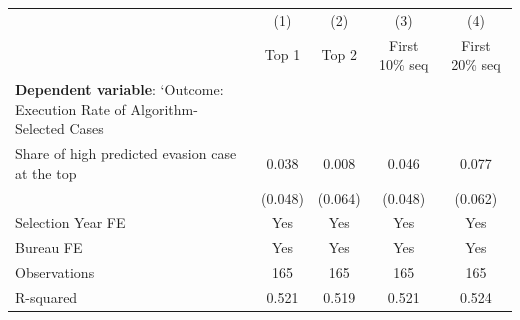 {
\def\sym#1{\ifmmode^{#1}\else\(^{#1}\)\fi}
\begin{tabular}{l*{4}{c}}
\toprule
            &\multicolumn{1}{c}{(1)}&\multicolumn{1}{c}{(2)}&\multicolumn{1}{c}{(3)}&\multicolumn{1}{c}{(4)}\\
            &\multicolumn{1}{c}{Top 1}&\multicolumn{1}{c}{Top 2}&\multicolumn{1}{c}{First 10\% seq}&\multicolumn{1}{c}{First 20\% seq}\\
\midrule
\textbf{Dependent variable}: `Outcome: Execution Rate of Algorithm-Selected Cases&                     &                     &                     &                     \\
\addlinespace
Share of high predicted evasion case at the top&       0.038         &       0.008         &       0.046         &       0.077         \\
            &     (0.048)         &     (0.064)         &     (0.048)         &     (0.062)         \\
\midrule
Selection Year FE&         Yes         &         Yes         &         Yes         &         Yes         \\
Bureau FE   &         Yes         &         Yes         &         Yes         &         Yes         \\
Observations&         165         &         165         &         165         &         165         \\
R-squared   &       0.521         &       0.519         &       0.521         &       0.524         \\
\bottomrule
\end{tabular}
}
